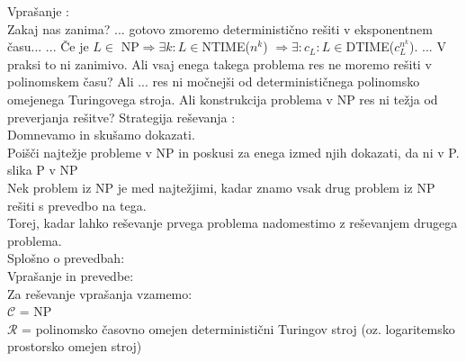 \documentclass[10pt,a4paper,oneside]{book}
\begin{document}
Vprašanje \PNP:\fixme\\
Zakaj nas zanima?
...
gotovo zmoremo deterministično rešiti v eksponentnem času...
...
Če je $L \in$ NP$\Rightarrow \exists k: L \in $NTIME($n^k$) $\Rightarrow \exists : c_L : L \in $DTIME($c_L^{n^k}$). ... V praksi to ni zanimivo.
Ali vsaj enega takega problema res ne moremo rešiti v polinomskem času?
Ali ... res ni močnejši od determinističnega polinomsko omejenega Turingovega stroja.
\br
Ali konstrukcija problema v NP res ni težja od preverjanja rešitve?
\br
Strategija reševanja \PNP:\\
Domnevamo \PniNP in skušamo dokazati.\\
Poišči najtežje probleme v NP in poskusi za enega izmed njih dokazati, da ni v P.\\
\fixme slika P v NP \\
Nek problem iz NP je med najtežjimi, kadar znamo vsak drug problem iz NP rešiti s prevedbo na tega.\\
Torej, kadar lahko reševanje prvega problema nadomestimo z reševanjem drugega problema.\\
Splošno o prevedbah:\\
\br
Vprašanje \PNP in prevedbe:\\
Za reševanje vprašanja \PNP vzamemo:\\
$\mathcal{C}$ = NP\\
$\mathcal{R}$ = polinomsko časovno omejen deterministični Turingov stroj (oz. logaritemsko prostorsko omejen stroj)\\
\end{document}
